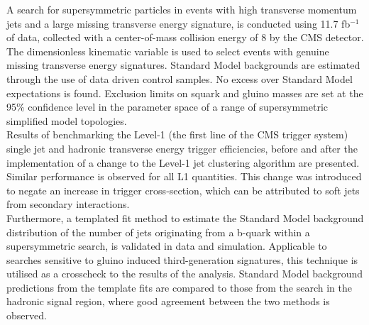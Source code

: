 A search for supersymmetric particles in events with high transverse momentum jets and a large missing transverse energy signature, is conducted using 11.7 fb$^{-1}$ of data, collected with a center-of-mass collision energy of 8 \TeV by the CMS detector. The dimensionless kinematic variable \alphat is used to select events with genuine missing transverse energy signatures. Standard Model backgrounds are estimated through the use of data driven control samples. 
No excess over Standard Model expectations is found. Exclusion limits on squark and gluino masses are set at the 95\% confidence level in the parameter space of a range of supersymmetric simplified model topologies.  \\ 

Results of benchmarking the Level-1 (the first line of the CMS trigger system) single jet and hadronic transverse energy trigger efficiencies, before and after the implementation of a change to the Level-1 jet clustering algorithm are presented. Similar performance is observed for all L1 quantities. This change was introduced to negate an increase in trigger cross-section, which can be attributed to soft jets from secondary interactions. \\

Furthermore, a templated fit method to estimate the Standard Model background distribution of the number of jets originating from a b-quark within a supersymmetric search, is validated in data and simulation. Applicable to searches sensitive to gluino induced third-generation signatures, this technique is utilised as a crosscheck to the results of the \alphat analysis. Standard Model background predictions from the template fits are compared to those from the \alphat search in the hadronic signal region, where good agreement between the two methods is observed. 